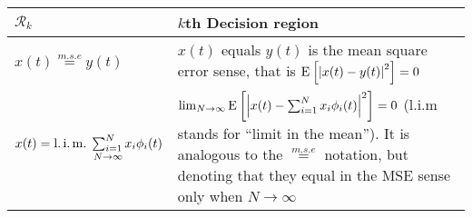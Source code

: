 \begin{xltabular}{\textwidth}{XX}
	\(\mathcal{R}_k\)                                                                                                                                                                                                                                                                                            & \(k\)th Decision region                                                                                                    \\ \hline
    \(x(t)\overset{m.s.e}{=}y(t)\) & \(x(t)\) equals \(y(t)\) is the mean square error sense, that is \(\E{\abs{x(t) - y(t)}^2} = 0\) \\ \hline
    \(x(t) = \limean_{N\rightarrow\infty}{\sum_{i=1}^{N} x_i \phi_i(t)}\)\cite{vantreesDetectionEstimationModulation2004} & \(\lim_{N\rightarrow\infty} \E{\abs{x(t) - \sum_{i=1}^{N} x_i \phi_i(t)}^{2}} = 0 \) (l.i.m stands for ``limit in the mean''). It is analogous to the \(\overset{m.s.e}{=}\) notation, but denoting that they equal in the MSE sense only when \(N\rightarrow\infty\) 
\end{xltabular}


